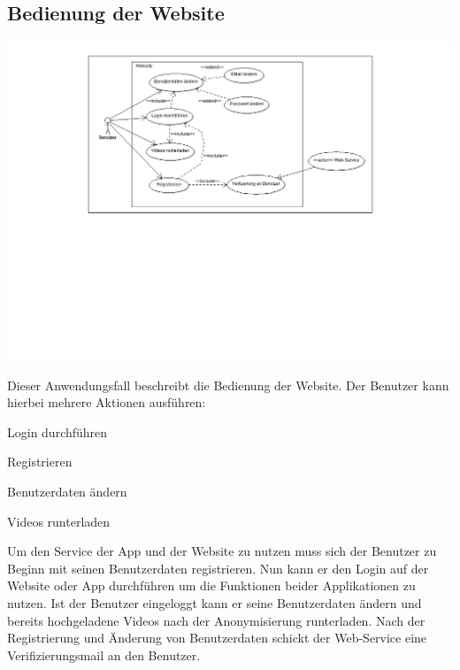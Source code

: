 \subsection{Bedienung der Website}
\begin{center}
\includegraphics[width=1\textwidth]{subtopicsFuncspec/systemModels/WebsiteAWFDiagram.png}
\end{center}
Dieser Anwendungsfall beschreibt die Bedienung der Website.
Der Benutzer kann hierbei mehrere Aktionen ausführen:
\begin{description}
\item Login durchführen
\item Registrieren
\item Benutzerdaten ändern
\item Videos runterladen
\end{description}
Um den Service der App und der Website zu nutzen muss sich der Benutzer zu Beginn mit seinen Benutzerdaten registrieren. 
Nun kann er den Login auf der Website oder App durchführen um die Funktionen beider Applikationen zu nutzen. 
Ist der Benutzer eingeloggt kann er seine Benutzerdaten ändern und bereits hochgeladene Videos nach der Anonymisierung runterladen.
Nach der Registrierung und Änderung von Benutzerdaten schickt der Web-Service eine Verifizierungsmail an den Benutzer.